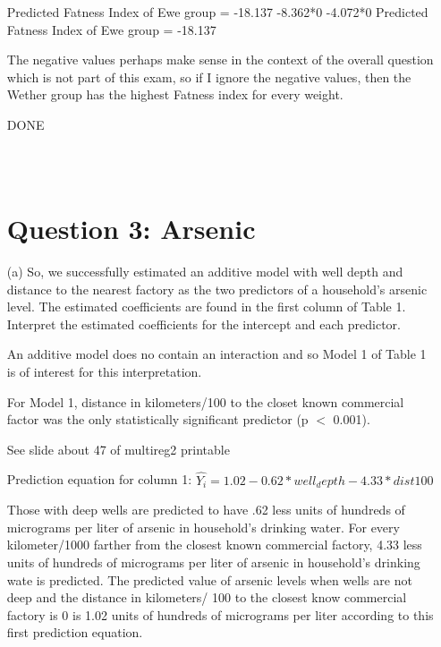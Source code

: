 \documentclass[12pt,letterpaper]{article}
\begin{document}
\begin{enumerate}
	
	Predicted Fatness Index of Ewe group = -18.137 -8.362*0 -4.072*0
	Predicted Fatness Index of Ewe group = -18.137
	
	The negative values perhaps make sense in the context of the overall question which is not part of this exam, so if I ignore the negative values, then the Wether group has the highest Fatness index for every weight.
	
	DONE
	
		\begin{verbatim}
			
			
		\end{verbatim}
		\vspace{.5cm}
	\section*{Question 3: Arsenic}  
		\item [(a)] 
		So, we successfully estimated an additive model with well depth and distance to the
		nearest factory as the two predictors of a household’s arsenic level. The estimated
		coefficients are found in the first column of Table 1. Interpret the estimated coefficients
		for the intercept and each predictor.
		
		An additive model does no contain an interaction and so Model 1 of Table 1 is of interest for this interpretation.
		
		For Model 1, distance in kilometers/100 to the closet known commercial factor was the only statistically significant predictor (p $<$ 0.001). 
		
		See slide about 47 of multireg2 printable
		
		Prediction equation for column 1: 
			$\hat{Y_i}= 1.02-0.62*well_depth -4.33*dist100$
			
			Those with deep wells are predicted to have .62 less units of hundreds of micrograms per liter of arsenic in household's drinking water.
			For every kilometer/1000 farther from the closest known commercial factory, 4.33 less units of hundreds of micrograms per liter of arsenic in household's drinking wate is predicted.
		The predicted value of arsenic levels when wells are not deep and the distance in kilometers/ 100 to the closest know commercial factory is 0 is 1.02 units of hundreds of micrograms per liter according to this first prediction  equation. 
		
		\begin{verbatim}
		
			
			

\end{verbatim}
\end{enumerate}
\end{document}
